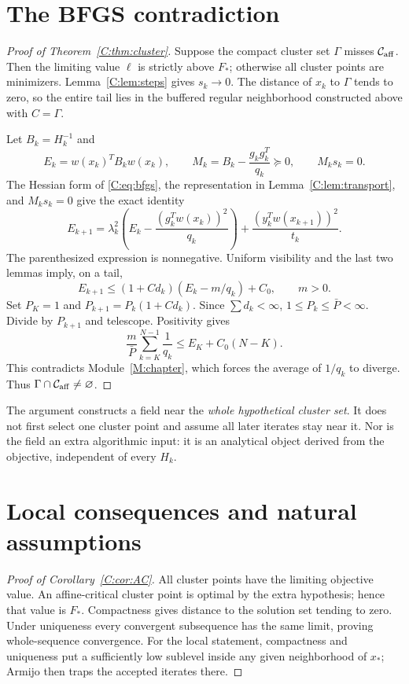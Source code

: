 \section{The BFGS contradiction}
\begin{proof}[Proof of Theorem~\ref{C:thm:cluster}]
Suppose the compact cluster set $\Gamma$ misses $\mathcal C_{\rm aff}$. Then the limiting value $\ell$ is strictly above $F_*$; otherwise all cluster points are minimizers. Lemma~\ref{C:lem:steps} gives $s_k\to0$. The distance of $x_k$ to $\Gamma$ tends to zero, so the entire tail lies in the buffered regular neighborhood constructed above with $C=\Gamma$.

Let $B_k=H_k^{-1}$ and
\[
 E_k=w(x_k)^TB_kw(x_k),\qquad
 M_k=B_k-\frac{g_kg_k^T}{q_k}\succeq0,\qquad M_ks_k=0.
\]
The Hessian form of \eqref{C:eq:bfgs}, the representation in Lemma~\ref{C:lem:transport}, and $M_ks_k=0$ give the exact identity
\begin{equation}\label{C:eq:energy}
 E_{k+1}=\lambda_k^2\left(E_k-\frac{(g_k^Tw(x_k))^2}{q_k}\right)
       +\frac{(y_k^Tw(x_{k+1}))^2}{t_k}.
\end{equation}
The parenthesized expression is nonnegative. Uniform visibility and the last two lemmas imply, on a tail,
\[
 E_{k+1}\le (1+C d_k)(E_k-m/q_k)+C_0,
 \qquad m>0.
\]
Set $P_K=1$ and $P_{k+1}=P_k(1+Cd_k)$. Since $\sum d_k<\infty$, $1\le P_k\le\bar P<\infty$. Divide by $P_{k+1}$ and telescope. Positivity gives
\[
 \frac{m}{\bar P}\sum_{k=K}^{N-1}\frac1{q_k}
 \le E_K+C_0(N-K).
\]
This contradicts Module~\ref{M:chapter}, which forces the average of $1/q_k$ to diverge. Thus $\Gamma\cap\mathcal C_{\rm aff}\ne\varnothing$.
\end{proof}

The argument constructs a field near the \emph{whole hypothetical cluster set}. It does not first select one cluster point and assume all later iterates stay near it. Nor is the field an extra algorithmic input: it is an analytical object derived from the objective, independent of every $H_k$.


\setcounter{section}{6}
\setcounter{theorem}{7}
\setcounter{equation}{16}
\section{Local consequences and natural assumptions}
\begin{proof}[Proof of Corollary~\ref{C:cor:AC}]
All cluster points have the limiting objective value. An affine-critical cluster point is optimal by the extra hypothesis; hence that value is $F_*$. Compactness gives distance to the solution set tending to zero. Under uniqueness every convergent subsequence has the same limit, proving whole-sequence convergence. For the local statement, compactness and uniqueness put a sufficiently low sublevel inside any given neighborhood of $x_*$; Armijo then traps the accepted iterates there.
\end{proof}

